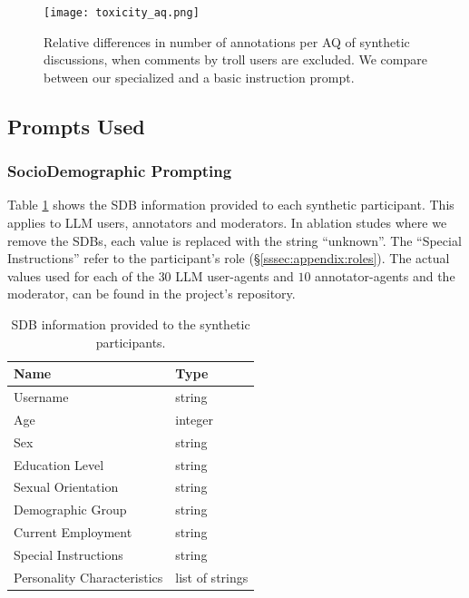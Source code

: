 \begin{figure}[t]
    \centering
    \texttt{[image: toxicity\_aq.png]}
    \caption{Relative differences in number of annotations per \ac{AQ} of synthetic discussions, when comments by troll users are excluded. We compare between our specialized and a basic instruction prompt.}
    \label{fig:aq_trolls}
\end{figure}



\subsection{Prompts Used}
\label{ssec:appendix:prompts}


\subsubsection{SocioDemographic Prompting}
\label{sssec:appendix:sdbs}

Table \ref{tab:sdb} shows the \ac{SDB} information provided to each synthetic participant. This applies to \ac{LLM} users, annotators and moderators. In ablation studes where we remove the \acp{SDB}, each value is replaced with the string “unknown”. The “Special Instructions” refer to the participant's role (\S\ref{sssec:appendix:roles}). The actual values used for each of the $30$ \ac{LLM} user-agents and $10$ annotator-agents and the moderator, can be found in the project's repository\analysislink.

\begin{table}[ht]
\centering
\begin{tabular}{|l|l|}
    \toprule
    Name & Type \\
    \midrule
    Username & string \\
    Age & integer \\
    Sex & string \\
    Education Level & string \\
    Sexual Orientation & string \\
    Demographic Group & string \\
    Current Employment & string \\
    Special Instructions & string \\
    Personality Characteristics & list of strings \\
    \bottomrule
\end{tabular}
\caption{\ac{SDB} information provided to the synthetic participants.}
\label{tab:sdb}
\end{table}
   

